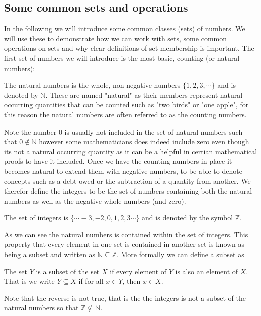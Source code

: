 \subsection{Some common sets and operations}
In the following we will introduce some common classes (sets) of numbers. We will use these to demonstrate how we can work with sets, some common operations on sets and why clear definitions of set membership is important. The first set of numbers we will introduce is the most basic, counting (or natural numbers):
\begin{definition}
The natural numbers is the whole, non-negative numbers $\{1,2,3, \cdots\}$ and is denoted by $\mathbb{N}$. These are named "natural" as their members represent natural occurring quantities that can be counted such as "two birds" or "one apple", for this reason the natural numbers are often referred to as the counting numbers.  
\end{definition}
Note the number $0$ is usually not included in the set of natural numbers such that $0 \notin  \mathbb{N}$ however some mathematicians does indeed include zero even though its not a natural occurring quantity as it can be a helpful in certian mathematical proofs to have it included. Once we have the counting numbers in place it becomes natural to extend them with negative numbers, to be able to denote concepts such as a debt owed or the subtraction of a quantity from another. We therefor define the integers to be the set of numbers containing both the natural numbers as well as the negative whole numbers (and zero). 
\begin{definition}
The set of integers is $\{\cdots −3, −2, 0, 1, 2, 3\cdots\}$ and is denoted by the symbol $\mathbb{Z}$. 
\end{definition}
As we can see the natural numbers is contained within the set of integers. This property that every element in one set is contained in another set is known as being a subset and written as $\mathbb{N} \subseteq \mathbb{Z}$. More formally we can define a subset as
\begin{definition}
The set $Y$ is a subset of the set $X$ if every element of $Y$ is also an element of $X$. That is we write $Y \subseteq X$ if for all $x \in Y$, then $x \in X$. 
\end{definition}
Note that the reverse is not true, that is the the integers is not a subset of the natural numbers so that $\mathbb{Z} \nsubseteq \mathbb{N}$. 

